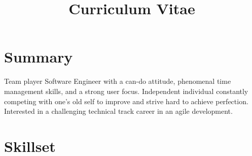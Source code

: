 \documentclass[11pt,a4paper,sans]{moderncv} %
\title{Curriculum Vitae}
\begin{document}
\makecvtitle %

\vspace{-15mm}

\section{Summary}

Team player Software Engineer with a can-do attitude, phenomenal time management skills, and a strong user focus. Independent individual constantly competing with one's old self to improve and strive hard to achieve perfection. Interested in a challenging technical track career in an agile development.


\begin{comment}

\section{Objective}

Intend to work in a responsible \& challenging environment which provides opportunities to learn, grow and utilize my potential and skills to its maximum.

\end{comment}

\section{Skillset}



\end{document}
